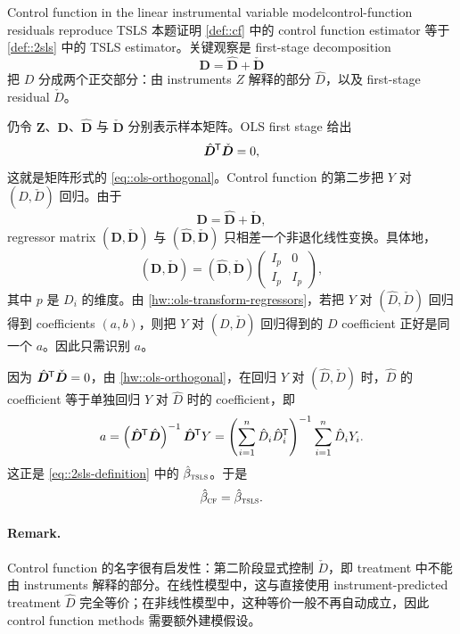 \begin{exercisesolution}{Control function in the linear instrumental variable model}{control-function residuals reproduce TSLS}
本题证明 \cref{def::cf} 中的 control function estimator 等于 \cref{def::2sls} 中的 TSLS estimator。关键观察是 first-stage decomposition
\[
\boldsymbol{D}=\hat{\boldsymbol{D}}+\check{\boldsymbol{D}}
\]
把 $D$ 分成两个正交部分：由 instruments $Z$ 解释的部分 $\hat{D}$，以及 first-stage residual $\check{D}$。

仍令 $\boldsymbol{Z}$、$\boldsymbol{D}$、$\hat{\boldsymbol{D}}$ 与 $\check{\boldsymbol{D}}$ 分别表示样本矩阵。OLS first stage 给出
\[
\hat{\boldsymbol{D}}^{\mkern-1.5mu\mathsf{T}}\check{\boldsymbol{D}}=0,
\]
这就是矩阵形式的 \cref{eq::ols-orthogonal}。Control function 的第二步把 $Y$ 对 $(D,\check{D})$ 回归。由于
\[
\boldsymbol{D}
=
\hat{\boldsymbol{D}}+\check{\boldsymbol{D}},
\]
regressor matrix $(\boldsymbol{D},\check{\boldsymbol{D}})$ 与 $(\hat{\boldsymbol{D}},\check{\boldsymbol{D}})$ 只相差一个非退化线性变换。具体地，
\[
(\boldsymbol{D},\check{\boldsymbol{D}})
=
(\hat{\boldsymbol{D}},\check{\boldsymbol{D}})
\begin{pmatrix}
I_p & 0\\
I_p & I_p
\end{pmatrix},
\]
其中 $p$ 是 $D_i$ 的维度。由 \cref{hw::ols-transform-regressors}，若把 $Y$ 对 $(\hat{D},\check{D})$ 回归得到 coefficients $(a,b)$，则把 $Y$ 对 $(D,\check{D})$ 回归得到的 $D$ coefficient 正好是同一个 $a$。因此只需识别 $a$。

因为 $\hat{\boldsymbol{D}}^{\mkern-1.5mu\mathsf{T}}\check{\boldsymbol{D}}=0$，由 \cref{hw::ols-orthogonal}，在回归 $Y$ 对 $(\hat{D},\check{D})$ 时，$\hat{D}$ 的 coefficient 等于单独回归 $Y$ 对 $\hat{D}$ 时的 coefficient，即
\[
a
=
\left(\hat{\boldsymbol{D}}^{\mkern-1.5mu\mathsf{T}}\hat{\boldsymbol{D}}\right)^{-1}
\hat{\boldsymbol{D}}^{\mkern-1.5mu\mathsf{T}} Y
=
\left(\sum_{i=1}^n \hat{D}_i\hat{D}_i^{\mkern-1.5mu\mathsf{T}}\right)^{-1}
\sum_{i=1}^n \hat{D}_iY_i.
\]
这正是 \cref{eq::2sls-definition} 中的 $\hat{\beta}_\textsc{tsls}$。于是
\[
\hat{\beta}_\textsc{cf}=\hat{\beta}_\textsc{tsls}.
\]

\paragraph{Remark.}
Control function 的名字很有启发性：第二阶段显式控制 $\check{D}$，即 treatment 中不能由 instruments 解释的部分。在线性模型中，这与直接使用 instrument-predicted treatment $\hat{D}$ 完全等价；在非线性模型中，这种等价一般不再自动成立，因此 control function methods 需要额外建模假设。
\end{exercisesolution}

